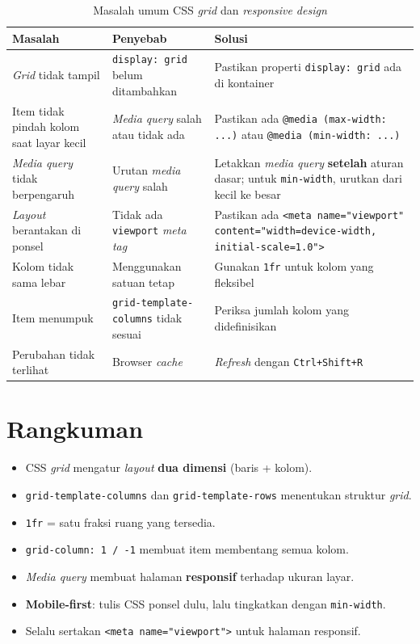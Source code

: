 \begin{table}[h!]
\centering
\caption{Masalah umum CSS \emph{grid} dan \emph{responsive design}}
\label{tab:trouble-07}
\begin{tabular}{|p{3.5cm}|p{4cm}|p{5cm}|}
\hline
\textbf{Masalah} & \textbf{Penyebab} & \textbf{Solusi} \\
\hline
\emph{Grid} tidak tampil & \texttt{display: grid} belum ditambahkan & Pastikan properti \texttt{display: grid} ada di kontainer \\
\hline
Item tidak pindah kolom saat layar kecil & \emph{Media query} salah atau tidak ada & Pastikan ada \texttt{@media (max-width: ...)} atau \texttt{@media (min-width: ...)} \\
\hline
\emph{Media query} tidak berpengaruh & Urutan \emph{media query} salah & Letakkan \emph{media query} \textbf{setelah} aturan dasar; untuk \texttt{min-width}, urutkan dari kecil ke besar \\
\hline
\emph{Layout} berantakan di ponsel & Tidak ada \texttt{viewport} \emph{meta tag} & Pastikan ada \texttt{<meta name="viewport" content="width=device-width, initial-scale=1.0">} \\
\hline
Kolom tidak sama lebar & Menggunakan satuan tetap & Gunakan \texttt{1fr} untuk kolom yang fleksibel \\
\hline
Item menumpuk & \texttt{grid-template-columns} tidak sesuai & Periksa jumlah kolom yang didefinisikan \\
\hline
Perubahan tidak terlihat & Browser \emph{cache} & \emph{Refresh} dengan \texttt{Ctrl+Shift+R} \\
\hline
\end{tabular}
\end{table}

\section{Rangkuman}
\label{sec:grid-rangkuman}

\begin{itemize}
  \item CSS \emph{grid} mengatur \emph{layout} \textbf{dua dimensi} (baris + kolom).
  \item \texttt{grid-template-columns} dan \texttt{grid-template-rows} menentukan struktur \emph{grid}.
  \item \texttt{1fr} = satu fraksi ruang yang tersedia.
  \item \texttt{grid-column: 1 / -1} membuat item membentang semua kolom.
  \item \emph{Media query} membuat halaman \textbf{responsif} terhadap ukuran layar.
  \item \textbf{Mobile-first}: tulis CSS ponsel dulu, lalu tingkatkan dengan \texttt{min-width}.
  \item Selalu sertakan \texttt{<meta name="viewport">} untuk halaman responsif.
\end{itemize}
